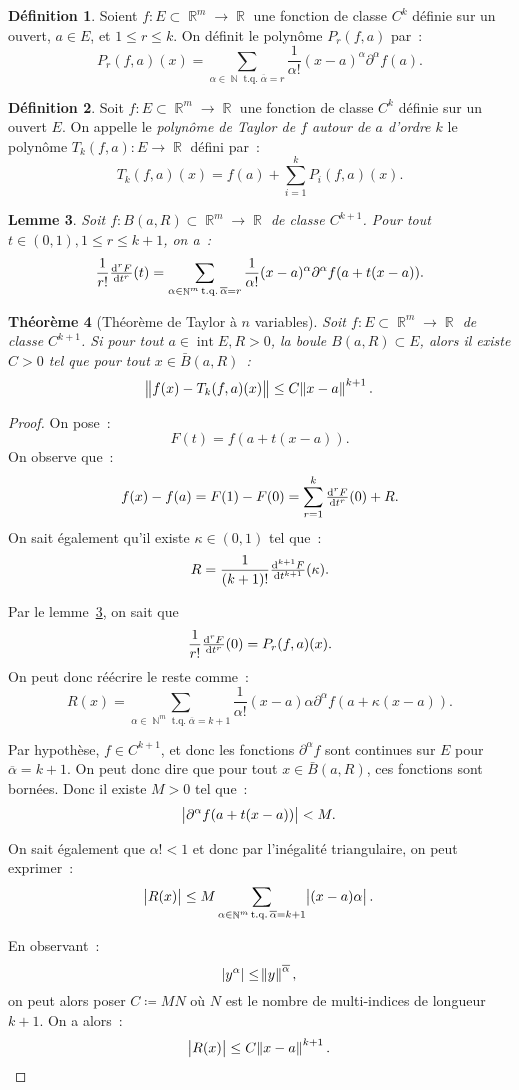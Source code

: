 \documentclass{article}
\DeclareMathOperator{\intr}{int}
\DeclareMathOperator{\N}{\mathbb N}
\DeclareMathOperator{\R}{\mathbb R}
\DeclareMathOperator{\tq}{ t.q. }
\newtheorem{thm}{Théorème}[section]
\newtheorem{lem}[thm]{Lemme}
\theoremstyle{definition}
\newtheorem{déf}[thm]{Définition}
\theoremstyle{remark}
\begin{document}
		\begin{déf} Soient $f : E \subset \R^m \to \R$ une fonction de classe $C^k$ définie sur un ouvert, $a \in E$, et $1 \leq r \leq k$. On définit le
		polynôme $P_r(f, a)$ par~:
		\[P_r(f, a)(x) = \sum_{\alpha \in \N \tq \overline \alpha = r}\frac 1{\alpha!}(x-a)^\alpha\partial^\alpha f(a).\]
		\end{déf}

		\begin{déf} Soit $f : E \subset \R^m \to \R$ une fonction de classe $C^k$ définie sur un ouvert $E$. On appelle le \emph{polynôme de Taylor de $f$
		autour de $a$ d'ordre $k$} le polynôme $T_k(f, a) : E \to \R$ défini par~:
		\[T_k(f, a)(x) = f(a) + \sum_{i=1}^kP_i(f, a)(x).\]
		\end{déf}

		\begin{lem}\label{lem:dérivéeFTaylor} Soit $f : B(a, R) \subset \R^m \to \R$ de classe $C^{k+1}$. Pour tout $t \in (0, 1), 1 \leq r \leq k+1$, on a~:
		\[\frac 1{r!}\od[r] Ft(t) = \sum_{\alpha \in \N^m \tq \overline \alpha = r}\frac 1{\alpha !}(x-a)^\alpha\partial^\alpha f(a + t(x-a)).\]
		\end{lem}

		\begin{thm}[Théorème de Taylor à $n$ variables] Soit $f : E \subset \R^m \to \R$ de classe $C^{k+1}$. Si pour tout $a \in \intr E, R > 0$, la boule
		$B(a, R) \subset E$, alors il existe $C > 0$ tel que pour tout $x \in \bar B(a, R)$~:
		\[\norm {f(x) - T_k(f, a)(x)} \leq C\norm{x-a}^{k+1}.\]
		\end{thm}

		\begin{proof} On pose~:
		\[F(t) = f(a + t(x-a)).\]
		On observe que~:
		\[f(x) - f(a) = F(1) - F(0) = \sum_{r=1}^k\od[r] Ft(0) + R.\]
		On sait également qu'il existe $\kappa \in (0, 1)$ tel que~:
		\[R = \frac 1{(k+1)!}\od[k+1]Ft(\kappa).\]

		Par le lemme~\ref{lem:dérivéeFTaylor}, on sait que~
		\[\frac 1{r!}\od[r]Ft(0) = P_r(f, a)(x).\]
		On peut donc réécrire le reste comme~:
		\[R(x) = \sum_{\alpha \in \N^m \tq \overline \alpha = k+1}\frac 1{\alpha!}(x-a)\alpha\partial^\alpha f(a + \kappa(x-a)).\]

		Par hypothèse, $f \in C^{k+1}$, et donc les fonctions $\partial^\alpha f$ sont continues sur $E$ pour $\overline \alpha = k+1$. On peut donc dire que
		pour tout $x \in \bar B(a, R)$, ces fonctions sont bornées. Donc il existe $M > 0$ tel que~:
		\[\abs{\partial^\alpha f(a + t(x-a))} < M.\]

		On sait également que $\alpha! < 1$ et donc par l'inégalité triangulaire, on peut exprimer~:
		\[\abs {R(x)} \leq M\sum_{\alpha \in \N^m \tq \overline \alpha=k+1}\abs {(x-a)\alpha}.\]

		En observant~:
		\[\abs {y^\alpha} \leq \norm y^{\overline \alpha},\]
		on peut alors poser $C \coloneqq MN$ où $N$ est le nombre de multi-indices de longueur $k+1$. On a alors~:
		\[\abs {R(x)} \leq C\norm{x-a}^{k+1}.\]
		\end{proof}
\end{document}
